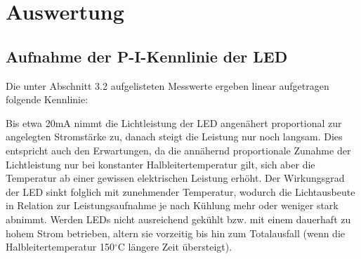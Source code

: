 \documentclass[bigchapter,colorback,accentcolor=tud4b,linedtoc,11pt]{tudreport}
\begin{document}
\chapter{Auswertung}
\section{Aufnahme der P-I-Kennlinie der LED}

Die unter Abschnitt 3.2 aufgelisteten Messwerte ergeben linear aufgetragen folgende Kennlinie:

\begin{center}
\begin{figure}[h]
\end{figure}
\end{center}

Bis etwa 20mA nimmt die Lichtleistung der LED angenähert proportional zur angelegten Stromstärke zu, danach steigt die Leistung nur noch langsam. Dies entspricht auch den Erwartungen, da die annähernd proportionale Zunahme der Lichtleistung nur bei konstanter Halbleitertemperatur gilt, sich aber die Temperatur ab einer gewissen elektrischen Leistung erhöht. Der Wirkungsgrad der LED sinkt folglich mit zunehmender Temperatur, wodurch die Lichtausbeute in Relation zur Leistungsaufnahme je nach Kühlung mehr oder weniger stark abnimmt. Werden LEDs nicht ausreichend gekühlt bzw. mit einem dauerhaft zu hohem Strom betrieben, altern sie vorzeitig bis hin zum Totalausfall (wenn die Halbleitertemperatur 150$^{\circ}$C längere Zeit übersteigt).
\end{document}
